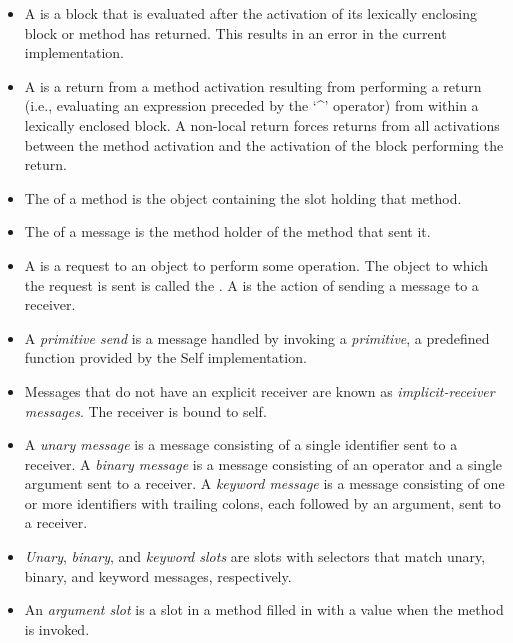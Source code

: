 \documentclass[letterpaper,10pt,english]{sphinxmanual}
\begin{document}
\begin{itemize}
\item {} 
A  is a block that is evaluated after the activation of its lexically enclosing block or method has returned. This results in an error in the current implementation.

\item {} 
A  is a return from a method activation resulting from performing a return (i.e., evaluating an expression preceded by the ‘\textasciicircum{}’ operator) from within a lexically enclosed block. A non-local return forces returns from all activations between the method activation and the activation of the block performing the return.

\item {} 
The  of a method is the object containing the slot holding that method.

\item {} 
The  of a message is the method holder of the method that sent it.

\item {} 
A  is a request to an object to perform some operation. The object to which the request is sent is called the . A  is the action of sending a message to a receiver.

\item {} 
A \emph{primitive send} is a message handled by invoking a \emph{primitive}, a predefined function provided by the Self implementation.

\item {} 
Messages that do not have an explicit receiver are known as \emph{implicit-receiver messages}. The receiver is bound to self.

\item {} 
A \emph{unary message} is a message consisting of a single identifier sent to a receiver. A \emph{binary message} is a message consisting of an operator and a single argument sent to a receiver. A \emph{keyword message} is a message consisting of one or more identifiers with trailing colons, each followed by an argument, sent to a receiver.

\item {} 
\emph{Unary}, \emph{binary}, and \emph{keyword slots} are slots with selectors that match unary, binary, and keyword messages, respectively.

\item {} 
An \emph{argument slot} is a slot in a method filled in with a value when the method is invoked.


\end{itemize}
\end{document}
